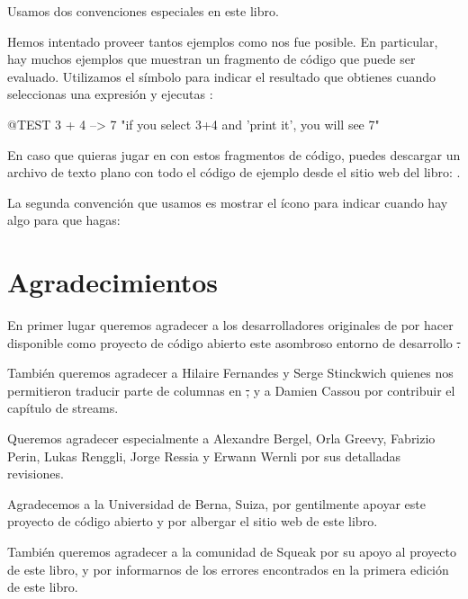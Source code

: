 \documentclass[a4paper,spanish, 10pt,twoside]{book}
\begin{document}
Usamos dos convenciones especiales en este libro.

Hemos intentado proveer tantos ejemplos como nos fue posible.
En particular, hay muchos ejemplos que muestran un fragmento de código que puede ser evaluado. Utilizamos el símbolo \ct{-->} para indicar el resultado que obtienes cuando seleccionas una expresión y ejecutas :

\begin{code}{@TEST}
3 + 4 --> 7    "if you select 3+4 and 'print it', you will see 7"
\end{code}

En caso que quieras jugar en \pharo con estos fragmentos de código, puedes descargar un archivo de texto plano con todo el código de ejemplo desde el sitio web del libro: \pbe.

La segunda convención que usamos es mostrar el ícono \dothisicon{} para indicar cuando hay algo para que hagas:


\section*{Agradecimientos}

En primer lugar queremos agradecer a los desarrolladores originales de \squeak por hacer disponible como proyecto de código abierto este asombroso entorno de desarrollo \st.

También queremos agradecer a Hilaire Fernandes y Serge Stinckwich quienes nos permitieron traducir parte de columnas en \st, y a Damien Cassou por contribuir el capítulo de streams.

Queremos agradecer especialmente a Alexandre Bergel, Orla Greevy, Fabrizio Perin, Lukas Renggli, Jorge Ressia y Erwann Wernli por sus detalladas revisiones.

Agradecemos a la Universidad de Berna, Suiza, por gentilmente apoyar este proyecto de código abierto y por albergar el sitio web de este libro.

También queremos agradecer a la comunidad de Squeak por su apoyo al proyecto de este libro, y por informarnos de los errores encontrados en la primera edición de este libro.


\ifx\wholebook\relax\else
   
   
\end{document}

